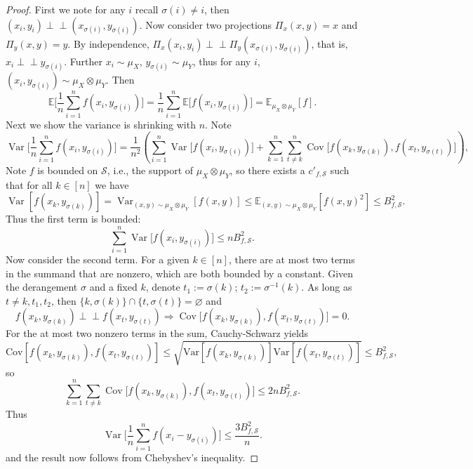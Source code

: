 \documentclass[12pt]{article}
\newcommand{\EE}{\mathbb{E}}
\theoremstyle{definition}
\newcommand{\Var}{\operatorname{Var}}
\newcommand{\Cov}{\operatorname{Cov}}
\newcommand{\ind}{\perp\!\!\!\!\perp}
\begin{document}
\begin{proof}
First we note for any $i$ recall $\sigma(i) \neq i$, then $(x_i, y_i) \ind (x_{\sigma(i)}, y_{\sigma(i)}) $. Now consider two projections $\Pi_x(x,y) = x$ and $\Pi_y(x, y)= y$. By independence, $\Pi_x(x_i, y_i) \ind \Pi_y(x_{\sigma(i)}, y_{\sigma(i)})$, that is, $x_i \ind y_{\sigma(i)}$. Further $x_i \sim \mu_X$, $y_{\sigma(i)} \sim \mu_Y$, thus for any $i$, $(x_i, y_{\sigma(i)}) \sim \mu_X \otimes \mu_Y $. Then 
$$
\EE \biggl[ \frac{1}{n} \sum^n_{i=1} f\left(x_i, y_{\sigma(i)}\right) \biggr] = \frac{1}{n} \sum^n_{i=1} \EE \biggl[ f\left(x_i, y_{\sigma(i)}\right) \biggr] =  \EE_{ \mu_X \otimes \mu_Y}[f].
$$
Next we show the variance is shrinking with $n$. Note
$$
\Var\biggl[ \frac{1}{n} \sum^n_{i=1} f\left(x_i, y_{\sigma(i)}\right) \biggr] = \frac{1}{n^2} \left( \sum^n_{i=1} \Var \biggr[ f\left(x_i, y_{\sigma(i)}\right) \biggr]  + \sum^n_{k=1} \sum^n_{t \neq k } \Cov \biggl[f\left(x_k, y_{\sigma(k)}\right) , f\left(x_t, y_{\sigma(t)}\right)   \biggr] \right),
$$
Note $f$ is bounded on $\mathcal{S}$, i.e., the support of $\mu_X \otimes \mu_Y$, so there exists a $c'_{f,\mathcal{S}}$ such that for all $k \in [n]$ we have
$$\Var [f\left(x_k, y_{\sigma(k)}\right)] = \Var_{(x,y)\sim\mu_X \otimes \mu_Y} [f(x,y)] \leq \EE_{(x,y)\sim\mu_X \otimes \mu_Y} [f(x,y)^2] \leq B_{f,\mathcal{S}}^2.$$ 
Thus the first term is bounded:
$$
\sum^n_{i=1} \Var \biggr[ f\left(x_i, y_{\sigma(i)}\right) \biggr] \leq n B_{f,\mathcal{S}}^2.
$$
Now consider the second term. For a given $k \in [n]$, there are at most two terms in the summand that are nonzero, which are both bounded by a constant. Given the derangement $\sigma$ and a fixed $k$, denote $t_1 :=\sigma(k)$; $t_2:=\sigma^{-1}(k)$. As long as $t \neq k, t_1, t_2$, then $\{k,\sigma(k)\}\cap\{t,\sigma(t)\}=\varnothing$ and 
$$
f\left(x_k, y_{\sigma(k)}\right) \ind f\left(x_t, y_{\sigma(t)}\right) \Rightarrow \Cov \biggl[f\left(x_k, y_{\sigma(k)}\right) , f\left(x_t, y_{\sigma(t)}\right)\biggr] = 0.
$$
For the at most two nonzero terms in the sum, Cauchy-Schwarz yields
$$\mathrm{Cov}\left[f(x_k,y_{\sigma(k)}),f(x_t,y_{\sigma(t)})\right]\leq \sqrt{\mathrm{Var}\left[f(x_k,y_{\sigma(k)})\right]\mathrm{Var}\left[f(x_t,y_{\sigma(t)})\right]}\leq B_{f,\mathcal{S}}^2,$$
so
$$
\sum^n_{k=1} \sum_{t \neq k } \Cov \biggl[f\left(x_k, y_{\sigma(k)}\right) , f\left(x_t, y_{\sigma(t)}\right) \biggr]\leq 2nB_{f,\mathcal{S}}^2.
$$
Thus
$$
\Var \biggl[ \frac{1}{n} \sum^n_{i=1} f\left( x_{i} - y_{\sigma(i)} \right) \biggl] \leq \frac{3B_{f,\mathcal{S}}^2}{n}.
$$
and the result now follows from Chebyshev's inequality.

\end{proof}
\end{document}
